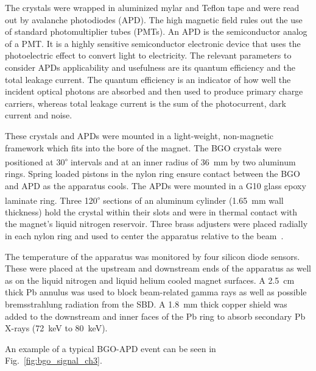\documentclass[oneside,12pt]{memoir}
\begin{document}
\par
The crystals were wrapped in aluminized mylar and Teflon tape and were read out by avalanche photodiodes (APD). The high magnetic field rules out the use of standard photomultiplier tubes (PMTs). An APD is the semiconductor analog of a PMT. It is a highly sensitive semiconductor electronic device that uses the photoelectric effect to convert light to electricity. The relevant parameters to consider APDs applicability and usefulness are its quantum efficiency and the total leakage current. The quantum efficiency is an indicator of how well the incident optical photons are absorbed and then used to produce primary charge carriers, whereas total leakage current is the sum of the photocurrent, dark current and noise. \par
These crystals and APDs were mounted in a light-weight, non-magnetic framework which fits into the bore of the magnet. The BGO crystals were positioned at 30\textsuperscript{$\circ$} intervals and at an inner radius of 36~mm by two aluminum rings. Spring loaded pistons in the nylon ring ensure contact between the BGO and APD as the apparatus cools. The APDs were mounted in a G10 glass epoxy laminate ring. Three 120\textsuperscript{$\circ$} sections of an aluminum cylinder (1.65~mm wall thickness) hold the crystal within their slots and were in thermal contact with the magnet's liquid nitrogen reservoir. Three brass adjusters were placed radially in each nylon ring and used to center the apparatus relative to the beam~\cite{Cooper201264}.\par
The temperature of the apparatus was monitored by four silicon diode sensors. These were placed at the upstream and downstream ends of the apparatus as well as on the liquid nitrogen and liquid helium cooled magnet surfaces. A 2.5~cm thick Pb annulus was used to block beam-related gamma rays as well as possible bremsstrahlung radiation from the SBD. A 1.8~mm thick copper shield was added to the downstream and inner faces of the Pb ring to absorb secondary Pb X-rays (72~keV to 80~keV).\par
An example of a typical BGO-APD event can be seen in Fig.~\ref{fig:bgo_signal_ch3}.\par
\end{document}
